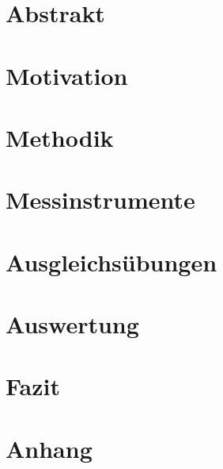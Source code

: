 





\setcounter{page}{2}

\section*{\centering Abstrakt}

\clearpage



\tableofcontents %
\clearpage

\listoffigures
\listoftables
\clearpage

\setcounter{section}{0}



\section{Motivation}


\section{Methodik}

\section{Messinstrumente}


\section{Ausgleichsübungen}


\section{Auswertung}

\section{Fazit}


\clearpage
{}
\printbibliography

\clearpage
{}
\appendix

\section*{Anhang}
% 


